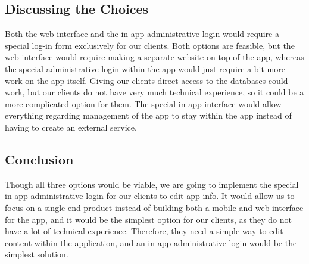 \documentclass[draftclsnofoot, onecolumn, 10pt, compsoc]{IEEEtran}
\begin{document}
		\subsection{Discussing the Choices}
			Both the web interface and the in-app administrative login would require a special log-in form exclusively for our clients. Both options are feasible, but the web interface would require making a separate website on top of the app, whereas the special administrative login within the app would just require a bit more work on the app itself. Giving our clients direct access to the databases could work, but our clients do not have very much technical experience, so it could be a more complicated option for them. The special in-app interface would allow everything regarding management of the app to stay within the app instead of having to create an external service.
		\subsection{Conclusion}
			Though all three options would be viable, we are going to implement the special in-app administrative login for our clients to edit app info. It would allow us to focus on a single end product instead of building both a mobile and web interface for the app, and it would be the simplest option for our clients, as they do not have a lot of technical experience. Therefore, they need a simple way to edit content within the application, and an in-app administrative login would be the simplest solution.
		
	
	
	
\end{document}
